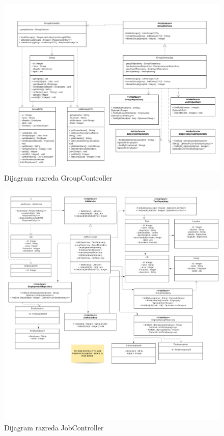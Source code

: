 			
			\eject
			\begin{figure}[H]
					\centering
					\includegraphics[width=\textwidth]{slike/fixGroupController.png}
					\caption{Dijagram razreda GroupController}
				\end{figure}
			
			
			\eject
			\begin{figure}[H]
					\centering
					\includegraphics[width=\textwidth]{slike/fixJobController.jpg}
					\caption{Dijagram razreda JobController}
				\end{figure}
			
